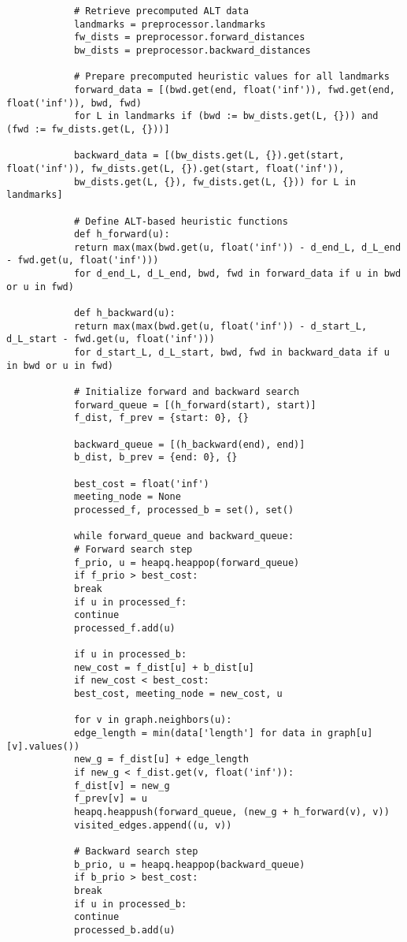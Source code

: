 \begin{appendices}
\begin{lstlisting}
			# Retrieve precomputed ALT data
			landmarks = preprocessor.landmarks
			fw_dists = preprocessor.forward_distances
			bw_dists = preprocessor.backward_distances
			
			# Prepare precomputed heuristic values for all landmarks
			forward_data = [(bwd.get(end, float('inf')), fwd.get(end, float('inf')), bwd, fwd)
			for L in landmarks if (bwd := bw_dists.get(L, {})) and (fwd := fw_dists.get(L, {}))]
			
			backward_data = [(bw_dists.get(L, {}).get(start, float('inf')), fw_dists.get(L, {}).get(start, float('inf')), 
			bw_dists.get(L, {}), fw_dists.get(L, {})) for L in landmarks]
			
			# Define ALT-based heuristic functions
			def h_forward(u):
			return max(max(bwd.get(u, float('inf')) - d_end_L, d_L_end - fwd.get(u, float('inf')))
			for d_end_L, d_L_end, bwd, fwd in forward_data if u in bwd or u in fwd)
			
			def h_backward(u):
			return max(max(bwd.get(u, float('inf')) - d_start_L, d_L_start - fwd.get(u, float('inf')))
			for d_start_L, d_L_start, bwd, fwd in backward_data if u in bwd or u in fwd)
			
			# Initialize forward and backward search
			forward_queue = [(h_forward(start), start)]
			f_dist, f_prev = {start: 0}, {}
			
			backward_queue = [(h_backward(end), end)]
			b_dist, b_prev = {end: 0}, {}
			
			best_cost = float('inf')
			meeting_node = None
			processed_f, processed_b = set(), set()
			
			while forward_queue and backward_queue:
			# Forward search step
			f_prio, u = heapq.heappop(forward_queue)
			if f_prio > best_cost:
			break
			if u in processed_f:
			continue
			processed_f.add(u)
			
			if u in processed_b:
			new_cost = f_dist[u] + b_dist[u]
			if new_cost < best_cost:
			best_cost, meeting_node = new_cost, u
			
			for v in graph.neighbors(u):
			edge_length = min(data['length'] for data in graph[u][v].values())
			new_g = f_dist[u] + edge_length
			if new_g < f_dist.get(v, float('inf')):
			f_dist[v] = new_g
			f_prev[v] = u
			heapq.heappush(forward_queue, (new_g + h_forward(v), v))
			visited_edges.append((u, v))
			
			# Backward search step
			b_prio, u = heapq.heappop(backward_queue)
			if b_prio > best_cost:
			break
			if u in processed_b:
			continue
			processed_b.add(u)
			

\end{lstlisting}
\end{appendices}
